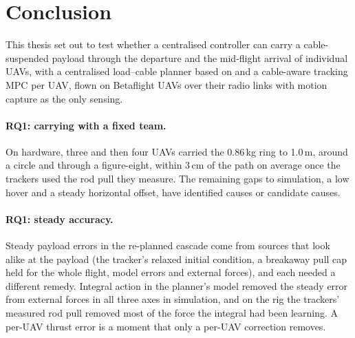 \section{Conclusion}
\label{sec:conclusion}


This thesis set out to test whether a centralised controller can carry a cable-suspended payload
through the departure and the mid-flight arrival of individual UAVs, with a centralised load--cable
planner based on \cite{tudelft} and a cable-aware tracking MPC per UAV, flown on Betaflight UAVs over
their radio links with motion capture as the only sensing.

\paragraph{RQ1: carrying with a fixed team.} On hardware, three and then four UAVs carried the 0.86\,kg ring
to 1.0\,m, around a circle and through a figure-eight, within 3\,cm of the path on average once the
trackers used the rod pull they measure. The remaining gaps to simulation, a low hover and a steady
horizontal offset, have identified causes or candidate causes.

\paragraph{RQ1: steady accuracy.} Steady payload errors in the re-planned cascade come from sources that look
alike at the payload (the tracker's relaxed initial condition, a breakaway pull cap held for the whole flight,
model errors and external forces), and each needed a different remedy. Integral action in the planner's model
removed the steady error from external forces in all three axes in simulation, and on the rig the trackers'
measured rod pull removed most of the force the integral had been learning. A per-UAV thrust error is a moment
that only a per-UAV correction removes.

